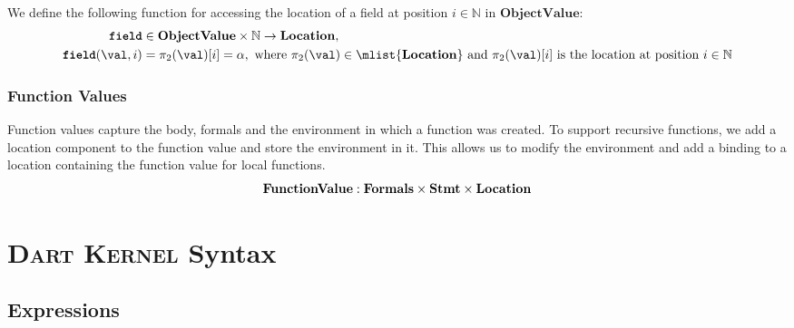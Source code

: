 \documentclass[a4paper,oneside,fleqn]{article}
\newcommand{\kernel}{\textsc{Dart Kernel}}
\newcommand{\NN}{\mathbb{N}}    %
\newcommand{\synt}[1]{\ensuremath{\text{\textbf{\texttt{#1}}}}}
\DeclareMathOperator{\new}{\synt{new}}
\DeclareMathOperator{\getfield}{\synt{field}}
\newcommand{\dstmt}{\mathbf{Stmt}}
\newcommand{\dfunval}{\mathbf{FunctionValue}}
\newcommand{\dobjval}{\mathbf{ObjectValue}}
\newcommand{\dformals}{\mathbf{Formals}}
\begin{document}
We define the following function for accessing the location of a field at position $i \in \NN$ in $\dobjval$:
\begin{align*}
\getfield &\in \dobjval \times \NN \rightarrow \dlocation,\\
\getfield(\val, i) &= \pi_2(\val)[i] = \loc, \text{ where $\pi_2(\val) \in \mlist{\dlocation}$ and $\pi_2(\val)[i]$ is the location at position $i \in \NN$}
\end{align*}

\subsubsection{Function Values}
\label{subsec:function-values}
Function values capture the body, formals and the environment in which a function was created.
To support recursive functions, we add a location component to the function value and store the environment in it.
This allows us to modify the environment and add a binding to a location containing the function value for local functions.
\[
    \dfunval : \dformals \times \dstmt \times \dlocation
\]


\section{\kernel{} Syntax}
\label{sec:definitions}


\subsection{Expressions}
\label{sec:expr-syntax}


\newcommand{\VariableGet}[1]{#1}
\newcommand{\VariableSet}[2]{#1=#2}

\newcommand{\PropertyGet}[2]{#1.#2}
\newcommand{\PropertySet}[3]{#1.#2=#3}

\newcommand{\DirectPropertyGet}[2]{#1.\{#2\}}
\newcommand{\DirectPropertySet}[3]{#1.\{#2\}=#3}

\newcommand{\SuperPropertyGet}[1]{\synt{super}.#1}
\newcommand{\SuperPropertySet}[2]{\synt{super}.#1=#2}

\newcommand{\StaticGet}[1]{\{#1\}}
\newcommand{\StaticSet}[2]{\{#1\}=#2}

\newcommand{\InstanceMethodInvocation}[3]{#1.#2(#3)}
\newcommand{\DInstanceMethodInvocation}[3]{#1.\{#2\}(#3)}
\newcommand{\SuperMethodInvocation}[2]{\synt{super}.#1(#2)}
\newcommand{\StaticInvocation}[2]{#1(#2)}
\newcommand{\New}[2]{\new\, #1\,(#2)}
\end{document}
